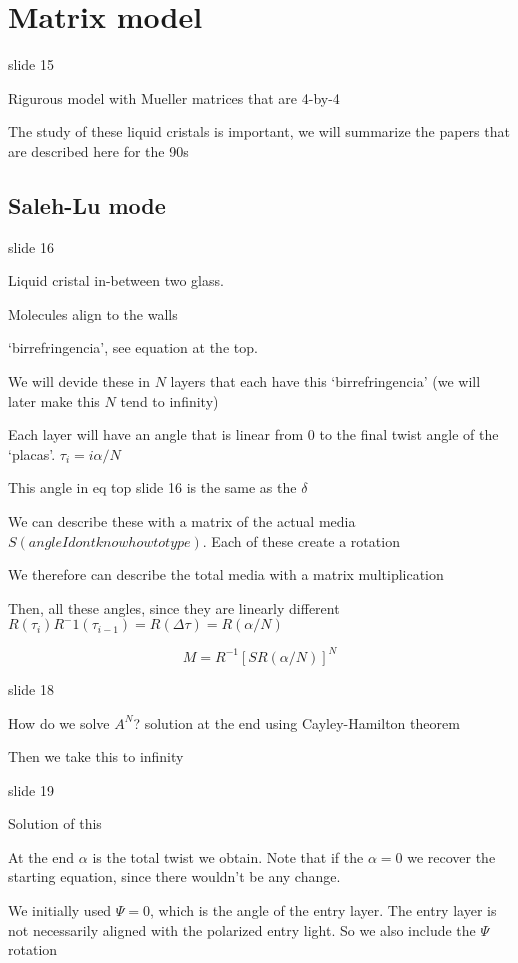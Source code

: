 \documentclass[../main/main.tex]{subfiles}
\begin{document}
\section{Matrix model}
slide 15

Rigurous model with Mueller matrices that are 4-by-4

The study of these liquid cristals is important, we will summarize the papers that are described here for the 90s


\subsection{Saleh-Lu mode}

slide 16

Liquid cristal in-between two glass.

Molecules align to the walls

`birrefringencia', see equation at the top.

We will devide these in $N$ layers that each have this `birrefringencia' (we will later make this $N$ tend to infinity)

Each layer will have an angle that is linear from 0 to the final twist angle of the `placas'. $\tau_i =  i \alpha / N$

This angle in eq top slide 16 is the same as the $\delta$

We can describe these with a matrix of the actual media $S(angle I dont know how to type)$. Each of these create a rotation

We therefore can describe the total media with a matrix multiplication

Then, all these angles, since they are linearly different $R(\tau_i)R^-1(\tau_{i-1}) = R(\Delta \tau) = R(\alpha / N)$

\begin{equation}
	M = R^{-1} \left[S R(\alpha/N)\right]^N
\end{equation}

slide 18

How do we solve $A^N$? solution at the end using Cayley-Hamilton theorem

Then we take this to infinity

slide 19

Solution of this

At the end $\alpha$ is the total twist we obtain. Note that if the $\alpha = 0$ we recover the starting equation, since there wouldn't be any change.


We initially used $\Psi = 0$, which is the angle of the entry layer. The entry layer is not necessarily aligned with the polarized entry light. So we also include the $\Psi$ rotation
\end{document}
